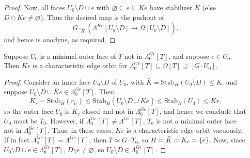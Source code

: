 \documentclass[a4paper,10pt,draft]{article}%
\numberwithin{equation}{section}%
\begin{document}
\begin{proof}
      Now, all faces $U_0 \setminus D \cup \bar e$ with $\varnothing \subseteq \bar e \subseteq K e$ have stabilizer $\bar K$
      (else $D \cap K e \neq \varnothing$).
      Thus the desired map is the pushout of
      \begin{equation}
            \label{CHAR_HORN_EQ}
            G \cdot_{\bar K} \left( \Lambda^{\bar K e}[U_0 \setminus D] \to \Omega[U_0 \setminus D] \right),
      \end{equation}
      and hence is anodyne, as required.
\end{proof}




\begin{lemma}
      Suppose $U_0$ is a minimal outer face of $T$ not in $\Lambda_0^{Ge}[T]$, and suppose $e\in U_0$.
      Then $K e$ is a characteristic edge orbit for $\Lambda_0^{Ge}[T] \subseteq \Omega[T] \supseteq[G \cdot U_0]$.
\end{lemma}
\begin{proof}
      Consider an inner face $U_0 \setminus D$ of $U_0$, with $\bar K = \mathrm{Stab}_H(U_0 \setminus D) \leq K$, and
      suppose $U_0 \setminus D \cup \bar K e \in \Lambda_0^{Ge}[T]$.
      Then
      \begin{equation}
            K_r = \mathrm{Stab}_H(r_U) \leq \mathrm{Stab}_H(U_0 \setminus D \cup \bar K e) \leq \mathrm{Stab}_H(U_0) \leq Kr,
      \end{equation}
      so the outer face $U_0$ is $K_r$-closed and not in $\Lambda_0^{Ge}[T]$, and hence we conclude that $U_0$ must be $T_0$.
      However, if $\Lambda^{Ge}_0[T] \neq \Lambda^{Ge}[T]$, $T_0$ is not a minimal outer face not in $\Lambda_0^{Ge}[T]$.
      Thus, in these cases, $K e$ is a characteristic edge orbit vacuously.
      If in fact $\Lambda_o^{Ge}[T] = \Lambda^{Ge}[T]$, then $T \simeq G \cdot T_0$, so $H = \bar K = K_r = \left\{e\right\}$.
      Now, since $U_0 \setminus D \cup e \in \Lambda_0^{Ge}[T]$,
      $D \setminus e \neq \varnothing$, so
      $U_0 \setminus D \in \Lambda_0^{Ge}[T]$.
\end{proof}

\end{document}

